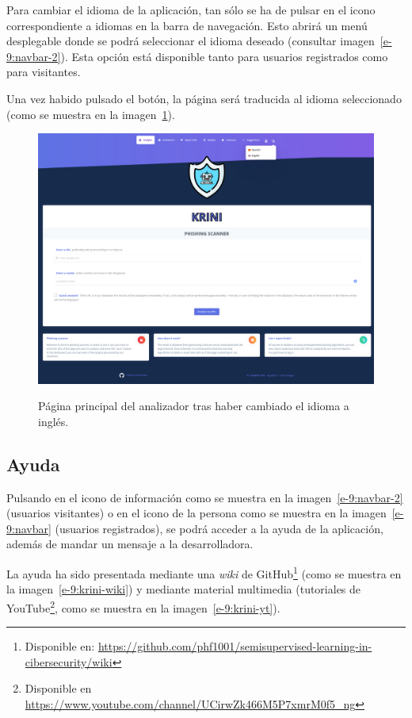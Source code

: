 Para cambiar el idioma de la aplicación, tan sólo se ha de pulsar en el icono correspondiente a idiomas en la barra de navegación. Esto abrirá un menú desplegable donde se podrá seleccionar el idioma deseado (consultar imagen~\ref{e-9:navbar-2}). Esta opción está disponible tanto para usuarios registrados como para visitantes.

Una vez habido pulsado el botón, la página será traducida al idioma seleccionado (como se muestra en la imagen~\ref{e-9:krini-english}).

\begin{figure}[h]
	\caption[Manual de usuario: página principal (inglés)]{Página principal del analizador tras haber cambiado el idioma a inglés.}
	\centering
	\includegraphics[width=\textwidth]{../img/anexos/user_guide/9_english}
	\label{e-9:krini-english}
\end{figure}


\subsection{Ayuda}

Pulsando en el icono de información como se muestra en la imagen~\ref{e-9:navbar-2} (usuarios visitantes) o en el icono de la persona como se muestra en la imagen~\ref{e-9:navbar} (usuarios registrados), se podrá acceder a la ayuda de la aplicación, además de mandar un mensaje a la desarrolladora.

La ayuda ha sido presentada mediante una \textit{wiki} de GitHub\footnote{Disponible en: \url{https://github.com/phf1001/semisupervised-learning-in-cibersecurity/wiki}} (como se muestra en la imagen~\ref{e-9:krini-wiki}) y mediante material multimedia (tutoriales de YouTube\footnote{Disponible en \url{https://www.youtube.com/channel/UCirwZk466M5P7xmrM0f5_ng}}, como se muestra en la imagen~\ref{e-9:krini-yt}).

